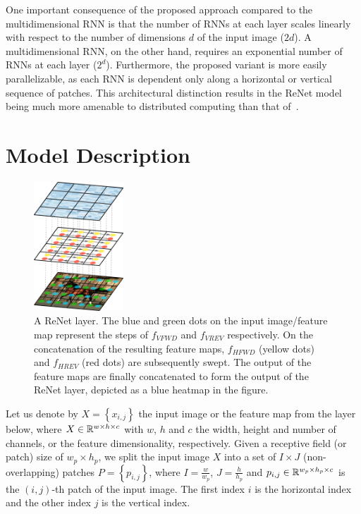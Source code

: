 One important consequence of the proposed approach compared to the
multidimensional RNN is that the number of RNNs at each layer scales linearly
with respect to the number of dimensions $d$ of the input image ($2d$). A
multidimensional RNN, on the other hand, requires an exponential number of RNNs
at each layer ($2^d$). Furthermore, the proposed variant is more easily
parallelizable, as each RNN is dependent only along a horizontal or vertical
sequence of patches. This architectural distinction results in the ReNet model
being much more amenable to distributed computing than that
of~\citet{Graves+Schmidhuber-2009}.


\section{Model Description}\label{sec:renet_model}

\begin{figure}[t]
    \centering
    \includegraphics[width=0.3\textwidth]{img/renet/renet_first_layer.pdf}
    \caption{A ReNet layer. The blue and green dots on the input image/feature
        map represent the steps of $f_{VFWD}$ and $f_{VREV}$ respectively. On
        the concatenation of the resulting feature maps, $f_{HFWD}$ (yellow
        dots) and $f_{HREV}$ (red dots) are subsequently swept. The output of
        the feature maps are finally concatenated to form the output of the
        ReNet layer, depicted as a blue heatmap in the figure.}
    \label{fig:renet_layer}
    \vspace{-3mm}
\end{figure}

Let us denote by $X=\left\{x_{i,j}\right\}$ the input image or the feature map
from the layer below, where $X \in \mathbb{R}^{w \times h \times c}$ with $w$, $h$ and
$c$ the width, height and number of channels, or the feature dimensionality,
respectively. Given a receptive field (or patch) size of $w_p \times h_p$, we
split the input image $X$ into a set of $I \times J$ (non-overlapping) patches
$P = \left\{ p_{i,j} \right\}$, where $I = \frac{w}{w_p}$, $J = \frac{h}{h_p}$
and $p_{i,j} \in \mathbb{R}^{w_p \times h_p \times c}$ is the $(i,j)$-th patch of the
input image. The first index $i$ is the horizontal index and the other index
$j$ is the vertical index.

